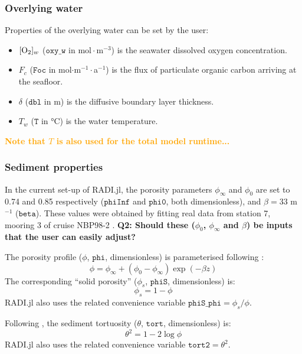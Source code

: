 \documentclass[a4paper]{article}
\newcommand{\code}[1]{\texttt{#1}}
\newcommand{\molmmm}{\mathrm{mol}\cdot\mathrm{m}^{-3}}
\newcommand{\degC}{\si{\degree}\mathrm{C}}
\newcommand{\wtf}[1]{\textcolor{Cerulean}{\textbf{#1}}}
\newcommand{\codenote}[1]{\textcolor{Orange}{\textbf{#1}}}
\begin{document}
\subsubsection{Overlying water}

Properties of the overlying water can be set by the user:

\begin{itemize}
  \item $[\ce{O2}]_w$ ($\code{oxy\_w}$ in $\molmmm$) is the seawater dissolved oxygen concentration.
  \item $F_c$ ($\code{Foc}$ in mol$\cdot$m$^{-1}\cdot$a$^{-1}$) is the flux of particulate organic carbon arriving at the seafloor.
  \item $\delta$ ($\code{dbl}$ in m) is the diffusive boundary layer thickness.
  \item $T_w$ ($\code{T}$ in $\degC$) is the water temperature.
\end{itemize}
\codenote{Note that $T$ is also used for the total model runtime...}

\subsubsection{Sediment properties}

In the current set-up of RADI.jl, the porosity parameters $\phi_\infty$ and $\phi_0$ are set to 0.74 and 0.85 respectively ($\code{phiInf}$ and $\code{phi0}$, both dimensionless), and $\beta = 33$ m$^{-1}$ ($\code{beta}$). These values were obtained by fitting real data from station 7, mooring 3 of cruise NBP98-2 \citep{sayles_benthic_2001}. \wtf{Q2: Should these ($\phi_0$, $\phi_\infty$ and $\beta$) be inputs that the user can easily adjust?}

The porosity profile ($\phi$, $\code{phi}$, dimensionless) is parameterised following \citet{boudreau_method--lines_1996}:
\begin{equation}\label{phi}
\phi = \phi_\infty + (\phi_0 - \phi_\infty) \exp(-\beta z)
\end{equation}
The corresponding ``solid porosity'' ($\phi_s$, $\code{phiS}$, dimensionless) is:
\begin{equation}\label{phiS}
\phi_s = 1 - \phi
\end{equation}
RADI.jl also uses the related convenience variable $\code{phiS\_phi} = \phi_s/\phi$.

Following \citet{boudreau_diffusive_1996}, the sediment tortuosity ($\theta$, $\code{tort}$, dimensionless) is:
\begin{equation}\label{tort}
\theta^2 = 1 - 2 \log \phi
\end{equation}
RADI.jl also uses the related convenience variable $\code{tort2} = \theta^2$.
\end{document}
